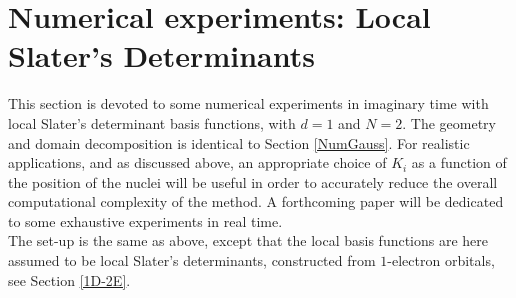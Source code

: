 \section{Numerical experiments: Local Slater's Determinants}\label{NumSlater}
This section is devoted to some numerical experiments in imaginary time  with local Slater's determinant basis functions, with $d=1$ and $N=2$. The geometry and domain decomposition is identical to Section \ref{NumGauss}.  For realistic applications, and as discussed above, an appropriate choice of $K_i$ as a function of the position of the nuclei will be useful in order to accurately reduce the overall computational complexity of the method. A forthcoming paper will be dedicated to some exhaustive experiments in real time.\\
The set-up is the same as above, except that the local basis functions are here assumed to be local Slater's determinants, constructed from $1$-electron orbitals, see Section \ref{1D-2E}. 
